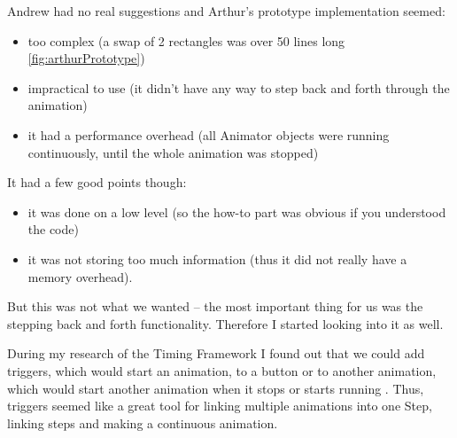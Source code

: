 \documentclass{l3proj}
\begin{document}


Andrew had no real suggestions and Arthur’s prototype implementation seemed: 
\begin{itemize}
	\item too complex (a swap of 2 rectangles was over 50 lines long \ref{fig:arthurPrototype})
	\item impractical to use (it didn’t have any way to step back and forth through the animation) 
	\item it had a performance overhead (all Animator objects were running continuously, until the whole animation was stopped)
\end{itemize}
It had a few good points though: 
\begin{itemize}
	\item it was done on a low level (so the how-to part was obvious if you understood the code) 
	\item it was not storing too much information (thus it did not really have a memory overhead). 
\end{itemize}
But this was not what we wanted – the most important thing for us was the stepping back and forth functionality.  Therefore I started looking into it as well.

During my research of the Timing Framework I found out that we could add triggers, which would start an animation, to a button or to another animation, which would start another animation when it stops or starts running \cite{website:TimingFrameworkDemo}. Thus, triggers seemed like a great tool for linking multiple animations into one Step, linking steps and making a continuous animation.


\end{document}
